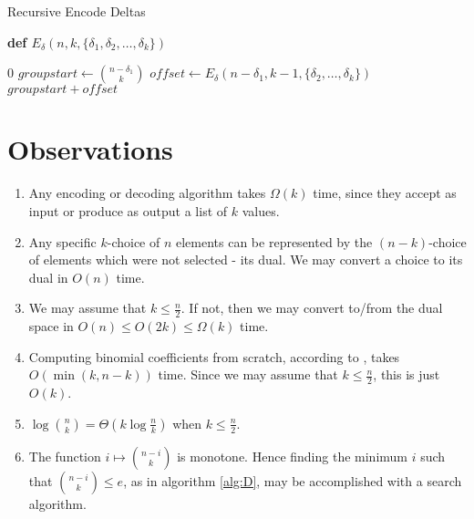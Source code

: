 \documentclass[preprint]{sigplanconf}
\begin{document}
	\begin{algorithm}[!ht]
	\caption{Recursive Encode Deltas}
	\label{alg:Ed}
	
	\textbf{def $E_\delta(n,k,\{\delta_1,\delta_2,\ldots,\delta_k\})$}
	\begin{algorithmic}[1]
	\RETURN $0$
	\ELSE
	\STATE $groupstart \gets \binom{n-\delta_1}{k}$
	\STATE $offset \gets E_\delta(n-\delta_1,k-1,\{\delta_2,\ldots,\delta_k\})$
	\RETURN $groupstart + offset$
	\ENDIF
	\end{algorithmic}	
	
	\end{algorithm}
	
	
	\section{Observations}
	
	\begin{enumerate}
		\item Any encoding or decoding algorithm takes $\Omega(k)$ time, since they accept as input or produce as output a list of $k$ values.
		\label{obs:Ok}
		
		\item Any specific $k$-choice of $n$ elements can be represented by the $(n-k)$-choice of elements which were not selected - its dual.
				  We may convert a choice to its dual in $O(n)$ time.
		\label{obs:dual}
		
		\item We may assume that $k \le \frac{n}{2}$.
					If not, then we may convert to/from the dual space in $O(n) \le O(2k) \le \Omega(k)$ time.
		\label{obs:k2n}
		
		\item Computing binomial coefficients from scratch, according to \cite{binom}, takes $O(\min(k,n-k))$ time.
					Since we may assume that $k \le \frac{n}{2}$, this is just $O(k)$.
		\label{obs:Ob}
		
		\item $\log\binom{n}{k} = \Theta(k\log\frac{n}{k})$ when $k \le \frac{n}{2}$.
		\label{obs:Tl}
		
		\item The function $i \mapsto \binom{n-i}{k}$ is monotone.
					Hence finding the minimum $i$ such that $\binom{n-i}{k} \le e$, as in algorithm \ref{alg:D}, may be accomplished with a search algorithm.
		\label{obs:search}
		
	\end{enumerate}
		
\end{document}
